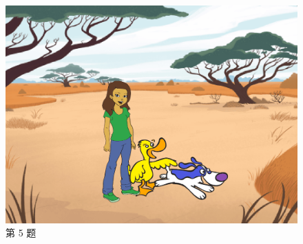 \documentclass[10pt, a4paper]{article}
\begin{document}
\begin{enumerate}
\begin{figure}[htbp]
\begin{minipage}[t]{.35\textwidth}
\begin{minipage}[t]{.45\textwidth}
                \end{minipage}
                \begin{minipage}[t]{.53\textwidth}
                    \includegraphics[width=\textwidth]{5-2.png}
                \end{minipage}
                \caption*{第 5 题}
            \end{minipage}
        \end{figure}


\end{enumerate}
\end{document}

